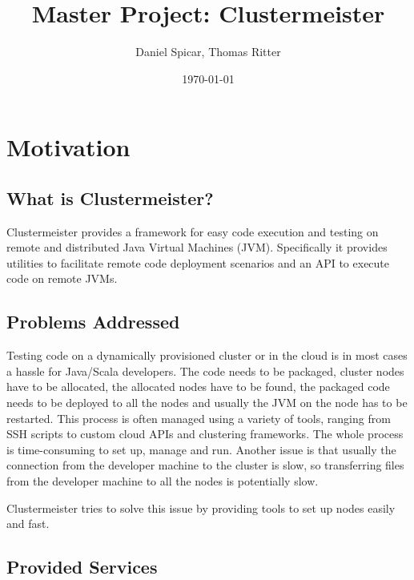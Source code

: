 \documentclass{article}
\begin{document}
\title{Master Project: Clustermeister}


\author{Daniel Spicar, Thomas Ritter}

\date{\today}

\maketitle

\section{Motivation}


\subsection{What is Clustermeister?}
Clustermeister provides a framework for easy code execution and testing on remote and distributed Java Virtual Machines (JVM). Specifically it provides utilities to facilitate remote code deployment scenarios and an API to execute code on remote JVMs.

\subsection{Problems Addressed}
Testing code on a dynamically provisioned cluster or in the cloud is in most cases a hassle for Java/Scala developers. The code needs to be packaged, cluster nodes have to be allocated, the allocated nodes have to be found, the packaged code needs to be deployed to all the nodes and usually the JVM on the node has to be restarted. This process is often managed using a variety of tools, ranging from SSH scripts to custom cloud APIs and clustering frameworks. The whole process is time-consuming to set up, manage and run. Another issue is that usually the connection from the developer machine to the cluster is slow, so transferring files from the developer machine to all the nodes is potentially slow. 

Clustermeister tries to solve this issue by providing tools to set up nodes easily and fast.


\subsection{Provided Services}
\end{document}
